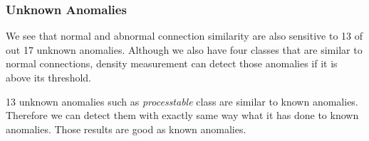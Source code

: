 %
\newpage
\subsubsection{Unknown Anomalies}
We see that normal and abnormal connection similarity are also sensitive to 13 of out 17 unknown anomalies. 
Although we also have four classes that are similar to normal connections, 
density measurement can detect those anomalies if it is above its threshold. 

13 unknown anomalies such as \textit{processtable} class are similar to known anomalies. 
Therefore we can detect them with exactly same way what it has done to known anomalies. 
Those results are good as known anomalies. 

